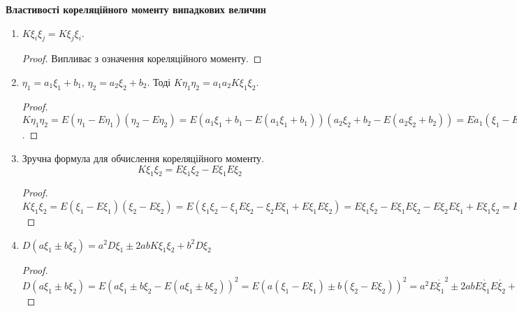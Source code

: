 \noindent \textbf{Властивості кореляційного моменту випадкових 
величин}
\begin{enumerate}
    \item $K\xi_i\xi_j = K\xi_j\xi_i$.
    \begin{proof}
        Випливає з означення кореляційного моменту.
    \end{proof}
    \item $\eta_1 = a_1\xi_1 + b_1$, $\eta_2 = a_2\xi_2 + b_2$.
    Тоді $K\eta_1\eta_2 = a_1a_2K\xi_1\xi_2$.
    \begin{proof}
        $K\eta_1\eta_2 = E(\eta_1 - E\eta_1)(\eta_2 - E\eta_2) = 
        E(a_1\xi_1 + b_1 - E(a_1\xi_1 + b_1))
        (a_2\xi_2 + b_2 - E(a_2\xi_2 + b_2)) = 
        Ea_1(\xi_1 - E\xi_1)a_2(\xi_2 - E\xi_2) = 
        a_1a_2E(\xi_1 - E\xi_1)(\xi_2 - E\xi_2) = 
        a_1a_2K\xi_1\xi_2$.
    \end{proof}

    \item Зручна формула для обчислення кореляційного моменту.
    \begin{equation}
        K\xi_1\xi_2 = E\xi_1\xi_2 - E\xi_1 E\xi_2
    \end{equation}
    \begin{proof}
        $K\xi_1\xi_2 = E(\xi_1 - E\xi_1)(\xi_2 - E\xi_2) = 
        E(\xi_1\xi_2 - \xi_1E\xi_2 - \xi_2E\xi_1 + E\xi_1E\xi_2) = 
        E\xi_1\xi_2 - E\xi_1E\xi_2 - E\xi_2E\xi_1 + E\xi_1\xi_2 = 
        E\xi_1\xi_2 - E\xi_1E\xi_2$
    \end{proof}
    
    \item $D(a\xi_1 \pm b\xi_2) = a^2D\xi_1 \pm 2abK\xi_1\xi_2 + 
    b^2D\xi_2$

    \begin{proof}
        $D(a\xi_1 \pm b\xi_2) = 
        E(a\xi_1 \pm b\xi_2 - E(a\xi_1 \pm b\xi_2))^2 =
        E(a(\xi_1-E\xi_1)\pm b(\xi_2 - E\xi_2))^2 = 
        a^2 E\mathring{\xi_1}^2 \pm 2abE\mathring{\xi_1}E\mathring{\xi_2} 
        + b^2 E\mathring{\xi_2}^2 = 
        a^2D\xi_1 \pm 2abK\xi_1\xi_2 + b^2D\xi_2$
    \end{proof}
\end{enumerate}